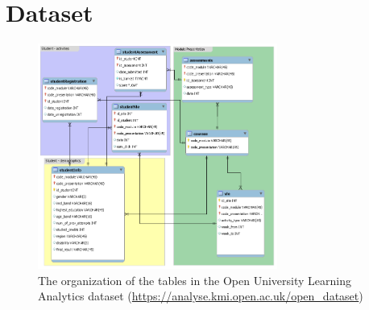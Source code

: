 \documentclass{article}
\begin{document}
\section{Dataset}

\begin{figure}
\centering
\includegraphics[width=0.7\textwidth]{database.png}
\caption{\label{fig:dataset}The organization of the tables in the Open University Learning Analytics dataset (\url{https://analyse.kmi.open.ac.uk/open_dataset})}
\end{figure}
\end{document}
